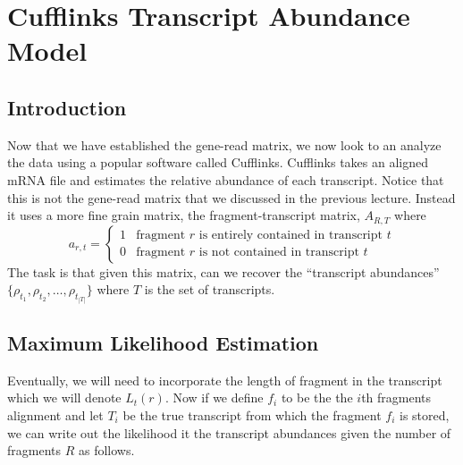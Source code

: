 \documentclass[11pt]{article}
\begin{document}
\section{Cufflinks Transcript Abundance Model } 

\subsection{Introduction}
Now that we have established the gene-read matrix, we now look to an analyze the data using a popular software called Cufflinks. Cufflinks takes an aligned mRNA file and estimates the relative abundance of each transcript. Notice that this is not the gene-read matrix that we discussed in the previous lecture. Instead it uses a more fine grain matrix, the fragment-transcript matrix, $A_{R,T}$ where  
\begin{equation}
a_{r,t} = \begin{cases}
			1 & \text{fragment $r$ is entirely contained in transcript $t$}\\
			0 & \text{fragment $r$ is not contained in transcript $t$}
		\end{cases}
\end{equation}
The task is that given this matrix, can we recover the ``transcript abundances'' $\{\rho_{t_1}, \rho_{t_2}, \ldots, \rho_{t_{|T|}}\}$ where $T$ is the set of transcripts.

\subsection{Maximum Likelihood Estimation}

 Eventually, we will need to incorporate the length of fragment in the transcript which we will denote $L_t(r)$. Now if we define $f_i$ to be the the $i$th fragments alignment and let $T_i$ be the true transcript from which the fragment $f_i$ is stored, we can write out the likelihood it the transcript abundances given the number of fragments $R$ as follows. 
\end{document}
